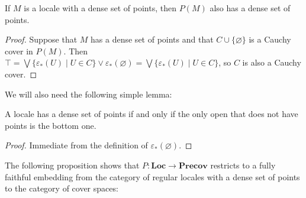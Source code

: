 \documentclass[reqno]{amsart}
\theoremstyle{definition}
\theoremstyle{remark}
\numberwithin{figure}{section}
\newcommand{\cat}[1]{\mathbf{#1}}
\begin{document}
\begin{prop}
If $M$ is a locale with a dense set of points, then $P(M)$ also has a dense set of points.
\end{prop}
\begin{proof}
Suppose that $M$ has a dense set of points and that $C \cup \{ \varnothing \}$ is a Cauchy cover in $P(M)$.
Then $\top = \bigvee \{ \varepsilon_*(U) \mid U \in C \} \vee \varepsilon_*(\varnothing) = \bigvee \{ \varepsilon_*(U) \mid U \in C \}$, so $C$ is also a Cauchy cover.
\end{proof}

We will also need the following simple lemma:

\begin{lem}
A locale has a dense set of points if and only if the only open that does not have points is the bottom one.
\end{lem}
\begin{proof}
Immediate from the definition of $\varepsilon_*(\varnothing)$.
\end{proof}

The following proposition shows that $P : \cat{Loc} \to \cat{Precov}$ restricts to a fully faithful embedding from the category of regular locales with a dense set of points to the category of cover spaces:
\end{document}
